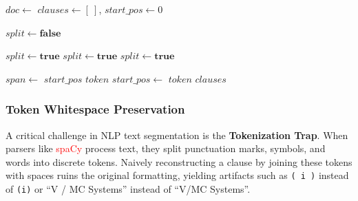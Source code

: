 \documentclass[twoside,final]{hcmut-report}
\begin{document}


\begin{algorithm}[H]
  \footnotesize
  \caption{Dependency-Aware Clause Splitting}
  \begin{algorithmic}[1]
    \State $doc \gets$ 
    \State $clauses \gets [\ ]$, $start\_pos \gets 0$

    \State $split \gets \textbf{false}$

     
    \State $split \gets \textbf{true}$
     
    \State $split \gets \textbf{true}$
     
    \State $split \gets \textbf{true}$
    \EndIf

    \State $span \gets$  $start\_pos$  $token$ 
    \State {}
    \State $start\_pos \gets$  $token$
    \EndIf
    \EndFor
    \State \Return $clauses$
    \EndProcedure
  \end{algorithmic}
\end{algorithm}

\subsubsection*{Token Whitespace Preservation}
A critical challenge in NLP text segmentation is the \textbf{Tokenization Trap}. When parsers like \textcolor{red}{\textcolor{red}{\textcolor{red}{spaCy}}} process text, they split punctuation marks, symbols, and words into discrete tokens. Naively reconstructing a clause by joining these tokens with spaces ruins the original formatting, yielding artifacts such as \verb|( i )| instead of \verb|(i)| or ``V / MC Systems'' instead of ``V/MC Systems''.
\end{document}
